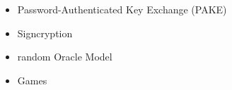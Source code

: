 \begin{itemize}
	\item Password-Authenticated Key Exchange (PAKE)
	\item Signcryption
	
	
	\item random Oracle Model
	
	\item Games
	

\end{itemize}
